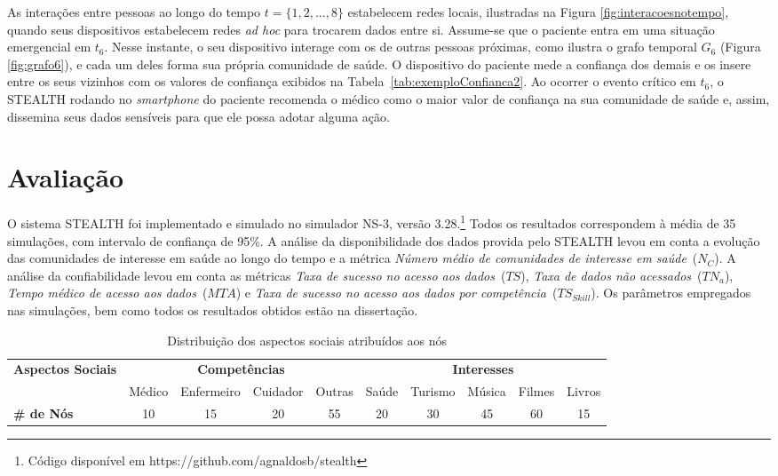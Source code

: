 \documentclass[12pt]{article}
\begin{document}
As interações entre pessoas ao longo do tempo $t = \{1,2,...,8\}$
estabelecem redes locais, ilustradas na Figura \ref{fig:interacoesnotempo}, quando seus dispositivos estabelecem redes \textit{ad hoc} para trocarem dados entre si. Assume-se que o paciente entra em uma situação emergencial em $t_6$. Nesse instante, o seu dispositivo interage com os de outras pessoas próximas, como ilustra o grafo temporal $G_6$ (Figura \ref{fig:grafo6}), e cada um deles forma sua própria comunidade de saúde. O dispositivo do paciente mede a confiança dos demais e os insere entre os seus vizinhos com os valores de confiança exibidos na  Tabela~\ref{tab:exemploConfianca2}. Ao ocorrer o evento crítico em $t_6$, o \mbox{STEALTH} rodando no \textit{smartphone} do paciente recomenda o médico como o maior valor de confiança na sua comunidade de saúde e, assim, dissemina seus dados sensíveis para que ele possa adotar alguma ação.

\section{Avaliação} \label{sec:aval}

O sistema \mbox{STEALTH} foi implementado e simulado no simulador NS-3, versão 3.28.\footnote{Código disponível em https://github.com/agnaldosb/stealth} Todos os resultados correspondem à média de 35 simulações, com intervalo de confiança de 95\%. A análise da disponibilidade dos dados provida pelo \mbox{STEALTH} levou em conta a evolução das comunidades de interesse em saúde ao longo do tempo e a métrica \textit{Número médio de comunidades de interesse em saúde}~($N_{C}$). A análise da confiabilidade levou em conta as métricas \textit{Taxa de sucesso no acesso aos dados}~($TS$), \textit{Taxa de dados não acessados}~($TN_a$), \textit{Tempo médico de acesso aos dados}~($MTA$) e \textit{Taxa de sucesso no acesso aos dados por competência}~($TS_{Skill}$). Os parâmetros empregados nas simulações, bem como todos os resultados obtidos estão na dissertação.

\begin{table}[H]
\setlength{\extrarowheight}{2.0pt}
\centering
\caption{Distribuição dos aspectos sociais atribuídos aos nós}
\vspace{-0.2cm}
\label{tab:aspectosAtribuidos}
\begin{tabular}{|l|cccc|ccccc|}
\hline%
\multirow{2}{*}{\textbf{Aspectos Sociais}} & \multicolumn{4}{c|}{\textbf{Competências}} & \multicolumn{5}{c|}{\textbf{Interesses}} \\ \cline{2-10}
&Médico&Enfermeiro&Cuidador&Outras&Saúde&Turismo&Música&Filmes&Livros \\ \hline
\textbf{\# de Nós} &10&15&20&55&20&30&45&60&15 \\ 
\hline%
\end{tabular}
\end{table}
\end{document}
